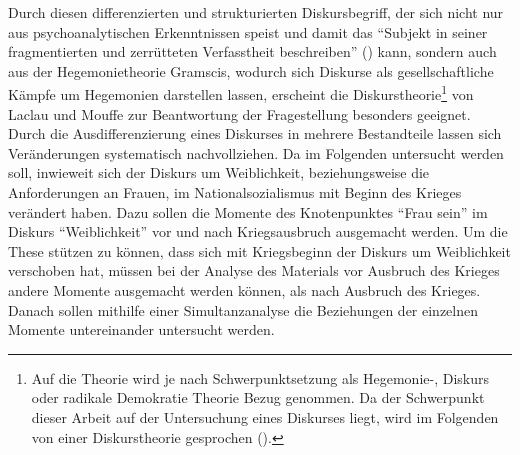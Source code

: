 \documentclass[12pt, titlepage=true, toc=bib]{scrartcl}
\begin{document}
Durch diesen differenzierten und strukturierten Diskursbegriff, der sich nicht nur aus psychoanalytischen Erkenntnissen speist und damit das "`Subjekt in seiner fragmentierten und zerrütteten Verfasstheit beschreiben"' (\cite[198]{nonhoff_kollektive_2007}) kann, sondern auch aus der Hegemonietheorie Gramscis, wodurch sich Diskurse als gesellschaftliche Kämpfe um Hegemonien darstellen lassen, erscheint die Diskurstheorie\footnote{Auf die Theorie wird je nach Schwerpunktsetzung als Hegemonie-, Diskurs oder radikale Demokratie Theorie Bezug genommen. Da der Schwerpunkt dieser Arbeit auf der Untersuchung eines Diskurses liegt, wird im Folgenden von einer Diskurstheorie gesprochen (\cite[vgl.][]{nonhoff_diskurs_2007-1}).} von Laclau und Mouffe zur Beantwortung der Fragestellung besonders geeignet. Durch die Ausdifferenzierung eines Diskurses in mehrere Bestandteile lassen sich Veränderungen systematisch nachvollziehen. Da im Folgenden untersucht werden soll, inwieweit sich der Diskurs um Weiblichkeit, beziehungsweise die Anforderungen an Frauen, im Nationalsozialismus mit Beginn des Krieges verändert haben. Dazu sollen die Momente des Knotenpunktes "`Frau sein"' im Diskurs "`Weiblichkeit"' vor und nach Kriegsausbruch ausgemacht werden. Um die These stützen zu können, dass sich mit Kriegsbeginn der Diskurs um Weiblichkeit verschoben hat, müssen bei der Analyse des Materials vor Ausbruch des Krieges andere Momente ausgemacht werden können, als nach Ausbruch des Krieges. Danach sollen mithilfe einer Simultanzanalyse die Beziehungen der einzelnen Momente untereinander untersucht werden.

\end{document}
